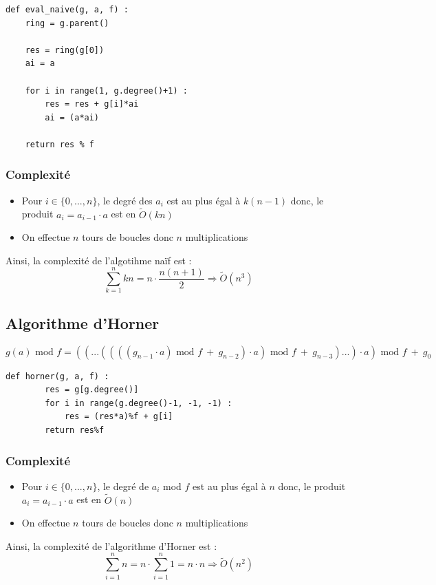 \documentclass[a4paper]{article}
\begin{document}
\begin{lstlisting}[title={naive}]
def eval_naive(g, a, f) :
	ring = g.parent()

	res = ring(g[0])
	ai = a
	
    for i in range(1, g.degree()+1) :
		res = res + g[i]*ai
		ai = (a*ai)

	return res % f
\end{lstlisting}

\subsubsection*{Complexité}
\begin{itemize}
    \item Pour $i \in \{0,...,n\}$, le degré des $a_i$ est au plus égal à $k(n-1)$ donc, le produit $a_i=a_{i-1}\cdot a$ est en $\tilde{O}(kn)$
    \item On effectue $n$ tours de boucles donc $n$ multiplications
\end{itemize}
Ainsi, la complexité de l'algotihme naïf est :
\[
\sum_{k=1}^{n}kn=n \cdot \dfrac{n(n+1)}{2} \Longrightarrow \tilde{O}(n^3)
\]

\subsection{Algorithme d'Horner}

\[
g(a)\text{ mod }f = ((...((((g_{n-1}\cdot a)\text{ mod }f\ +\ g_{n-2})\cdot a)\text{ mod }f\ +\ g_{n-3})...)\cdot a)\text{ mod }f\ +\ g_0
\]

\begin{lstlisting}[title={Horner}]
    def horner(g, a, f) :
        res = g[g.degree()]
        for i in range(g.degree()-1, -1, -1) :
            res = (res*a)%f + g[i]
        return res%f
    \end{lstlisting}

\subsubsection*{Complexité}
\begin{itemize}
    \item Pour $i \in \{0,...,n\}$, le degré de $a_i$ mod $f$ est au plus égal à $n$ donc, le produit $a_i=a_{i-1}\cdot a$ est en $\tilde{O}(n)$
    \item On effectue $n$ tours de boucles donc $n$ multiplications
\end{itemize}
Ainsi, la complexité de l'algorithme d'Horner est :
\[
\sum_{i=1}^n n=n\cdot \sum_{i=1}^n 1 = n\cdot n\Longrightarrow \tilde{O}(n^2)
\]
\end{document}
